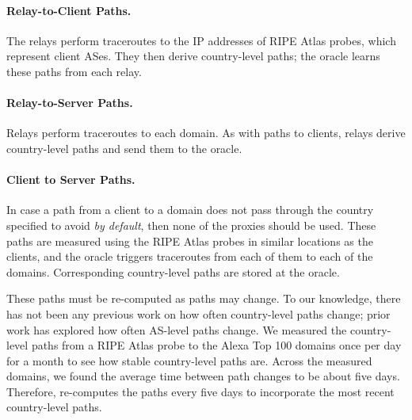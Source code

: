 \paragraph{Relay-to-Client Paths.} The \system{} relays perform
traceroutes to the IP addresses of RIPE Atlas probes, which 
represent client ASes.  They then derive country-level paths; the
oracle learns these paths from each relay.  

\paragraph{Relay-to-Server Paths.} Relays perform 
traceroutes to each domain.  As with paths to clients,
relays derive country-level paths and send them to the oracle.

\paragraph{Client to Server Paths.} In case a path from a client to a 
domain does not pass through the country specified to avoid {\it by default}, 
then none of the proxies should be used.  
These paths are measured using the RIPE Atlas probes in similar
locations as the clients, and the oracle triggers traceroutes from
each of them to each of the domains.  Corresponding country-level
paths are stored at the oracle.

These paths must be re-computed 
as paths may change.  To our knowledge, there has not been any previous work 
on how often country-level paths change; prior work has explored how often 
AS-level paths change.  We measured the country-level paths from a RIPE Atlas probe to the 
Alexa Top 100 domains once per day for a month to see how stable country-level paths 
are.  Across the measured domains, we found the average time between path changes to 
be about five days.  Therefore, \system{} re-computes the paths every five days to incorporate the 
most recent country-level paths.  


